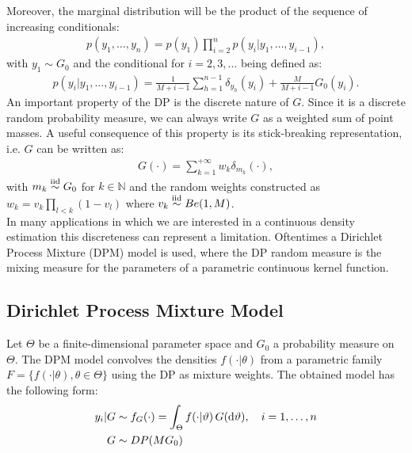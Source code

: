 Moreover, the marginal distribution will be the product of the sequence of increasing conditionals:
\begin{align*}
	p(y_1,\dots,y_n)= p(y_1)\prod\limits_{i=2}^{n} p(y_i|y_1,\dots,y_{i-1}),
\end{align*}
with $y_1 \sim G_0$ and the conditional for $i=2,3,\dots$ being defined as:
\begin{align*}
	p(y_i|y_1,\dots,y_{i-1})= \frac{1}{M+i-1}\sum_{h=1}^{n-1} \delta_{y_h}(y_i) +\frac{M}{M+i-1} G_0(y_i).
\end{align*}
An important property of the DP is the discrete nature of $G$.
Since it is a discrete random probability measure, we can always write $G$ as a weighted sum of point masses.
A useful consequence of this property is its stick-breaking representation, i.e. $G$ can be written as:
\begin{align*}
	G(\cdot) = \sum_{k=1}^{+\infty} w_k \delta_{m_k} (\cdot),
\end{align*}
with $m_k \stackrel{\text{iid}}{\sim} G_0$ for $k\in\mathbb{N}$ and the random weights constructed as $w_k =v_k\prod\limits_{l<k} (1-v_l)$ where $v_k \stackrel{\text{iid}}{\sim} Be(1,M)$. \\
In many applications in which we are interested in a continuous density estimation this discreteness can represent a limitation.
Oftentimes a Dirichlet Process Mixture (DPM) model is used, where the DP random measure is the mixing measure for the parameters of a parametric continuous kernel function.

\subsection{Dirichlet Process Mixture Model}
Let $\Theta$ be a finite-dimensional parameter space and $G_0$ a probability measure on $\Theta$.
The DPM model convolves the densities $f(\cdot|\theta)$ from a parametric family $F =\{f(\cdot|\theta), \theta \in \Theta \}$ using the DP as mixture weights.
The obtained model has the following form:
\begin{equation}
	\begin{aligned}\label{dpm-1}
	y_i | G &\sim f_G(\cdot) = \int_\Theta f(\cdot|\vartheta) \, G(\mathrm d\vartheta), \quad i=1,\dots,n \\
	G &\sim DP(M G_0)
	\end{aligned}
\end{equation}

